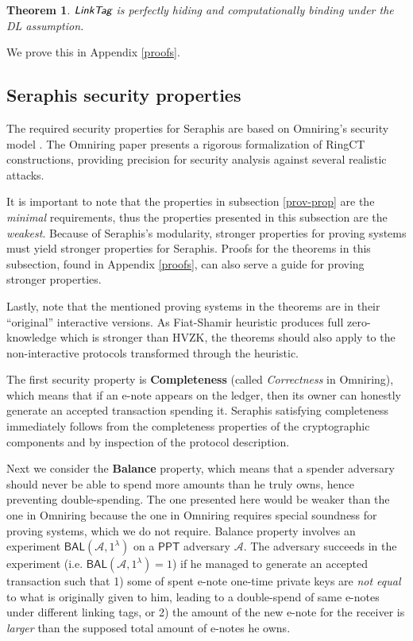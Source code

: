 \documentclass{article}
\newtheorem{theorem}{Theorem}[section]
\begin{document}
\begin{theorem}\label{thm-linktag}
$\emph{\textsf{LinkTag}}$ is perfectly hiding and computationally binding under the DL assumption.
\end{theorem}
\noindent We prove this in Appendix \ref{proofs}.

\subsection{Seraphis security properties}\label{sec-thm}
The required security properties for Seraphis are based on Omniring's security model \cite{omniring}. The Omniring paper presents a rigorous formalization of RingCT constructions, providing precision for security analysis against several realistic attacks.

It is important to note that the properties in subsection \ref{prov-prop} are the \textit{minimal} requirements, thus the properties presented in this subsection are the \textit{weakest}. Because of Seraphis's modularity, stronger properties for proving systems must yield stronger properties for Seraphis. Proofs for the theorems in this subsection, found in Appendix \ref{proofs}, can also serve a guide for proving stronger properties.

Lastly, note that the mentioned proving systems in the theorems are in their ``original'' interactive versions. As Fiat-Shamir heuristic produces full zero-knowledge which is stronger than HVZK, the theorems should also apply to the non-interactive protocols transformed through the heuristic.

The first security property is \textbf{Completeness} (called \textit{Correctness} in Omniring), which means that if an e-note appears on the ledger, then its owner can honestly generate an accepted transaction spending it. Seraphis satisfying completeness immediately follows from the completeness properties of the cryptographic components and by inspection of the protocol description.

Next we consider the \textbf{Balance} property, which means that a spender adversary should never be able to spend more amounts than he truly owns, hence preventing double-spending. The one presented here would be weaker than the one in Omniring because the one in Omniring requires special soundness for proving systems, which we do not require. Balance property involves an experiment $\textsf{BAL}(\mathcal{A}, 1^{\lambda})$  on a $\textsf{PPT}$ adversary $\mathcal{A}$. The adversary succeeds in the experiment (i.e. $\textsf{BAL}(\mathcal{A}, 1^{\lambda})=1$) if he managed to generate an accepted transaction such that 1) some of spent e-note one-time private keys are \textit{not equal} to what is originally given to him, leading to a double-spend of same e-notes under different linking tags, or 2) the amount of the new e-note for the receiver is \textit{larger} than the supposed total amount of e-notes he owns.
\end{document}
